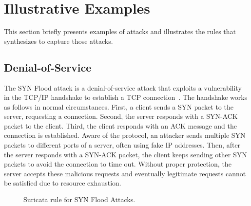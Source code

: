 \documentclass[sigconf,review, anonymous]{acmart}
\begin{document}


\section{Illustrative Examples}
\label{sec:suri-metas-coverage}

This section briefly presents examples of attacks and illustrates the
rules that \tname{} synthesizes to capture those attacks.


\subsection{Denial-of-Service}
\label{sec:dos}

The SYN Flood attack is a denial-of-service attack that exploits a vulnerability in the TCP/IP handshake
to establish a TCP connection~\cite{cloudfare-synflood}. The handshake
works as follows in normal circumstances. First, a client sends a SYN
packet to the server, requesting a connection. Second, the server
responds with a SYN-ACK packet to the client. Third, the client
responds with an ACK message and the connection is established. Aware
of the protocol, an attacker sends multiple SYN packets to different
ports of a server, often using fake IP addresses. Then, after the
server responds with a SYN-ACK packet, the client keeps sending other
SYN packets to avoid the connection to time out. Without proper
protection, the server accepts these malicious requests and eventually
legitimate requests cannot be satisfied due to resource exhaustion.

\begin{figure}[h!]
  
  \caption{Suricata rule for SYN Flood Attacks.}
  \label{fig:synflood-example}
\end{figure}
\end{document}
